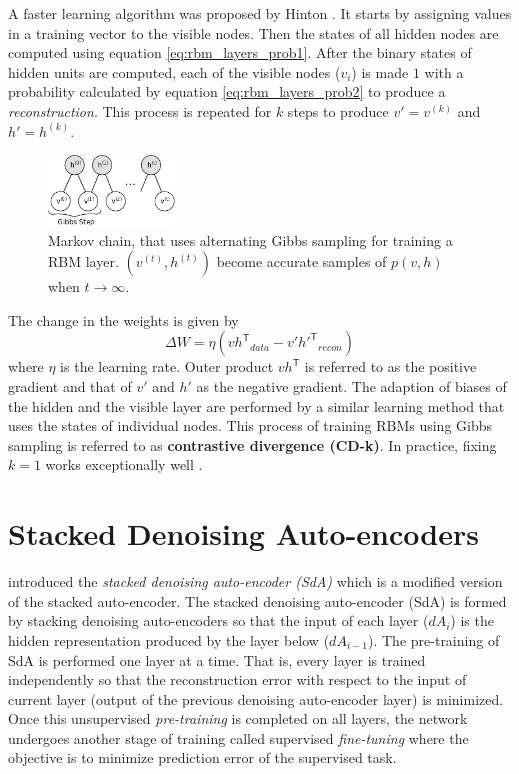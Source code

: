 A faster learning algorithm was proposed by Hinton \cite{hinton2002training,hinton2006reducing,hinton2010practical}.  It starts by assigning values in a training vector to the visible nodes.  Then the states of all hidden nodes are computed using equation \ref{eq:rbm_layers_prob1}.  After the binary states of hidden units are computed, each of the visible nodes ($v_i$) is made $1$ with a probability calculated by equation \ref{eq:rbm_layers_prob2} to produce a \textit{reconstruction}.  This process is repeated for $k$ steps to produce $v'= v^{(k)}$ and $h' = h^{(k)}$. 

\begin{figure}[ht]
\centering
\includegraphics[width=0.3\textwidth]{./imgs/markov_chain.png}
\caption[Markov chain of training RBM layer]{Markov chain, that uses alternating Gibbs sampling for training a RBM layer. $(v^{(t)}, h^{(t)})$ become accurate samples of $p(v,h)$ when $t \rightarrow \infty$.}
\label{fig:rbmmarkovChain}
\end{figure}

The change in the weights is given by
$$ \Delta W = \eta ({vh^\mathsf{T}}_{data} - {v'h'^{\mathsf{T}}}_{recon}) $$
where $\eta$ is the learning rate.  Outer product $vh^\mathsf{T}$ is referred to as the positive gradient and that of $v'$ and $h'$ as the negative gradient.  The adaption of biases of the hidden and the visible layer are performed by a similar learning method that uses the states of individual nodes.  This process of training RBMs using Gibbs sampling is referred to as \textbf{contrastive divergence (CD-k)}.  In practice, fixing $k=1$ works exceptionally well \cite{hinton2010practical}.

\section{Stacked Denoising Auto-encoders}
\citet{vincent2010stacked} introduced the \emph{stacked denoising auto-encoder (SdA)} which is a modified version of the stacked auto-encoder.  The stacked denoising auto-encoder (SdA) is formed by stacking denoising auto-encoders so that the input of each layer ($dA_i$) is the hidden representation produced by the layer below ($dA_{i-1}$).  The pre-training of SdA is performed one layer at a time.  That is, every layer is trained independently so that the reconstruction error with respect to the input of current layer (output of the previous denoising auto-encoder layer) is minimized.  Once this unsupervised \textit{pre-training} is completed on all layers, the network undergoes another stage of training called supervised \textit{fine-tuning} where the objective is to minimize prediction error of the supervised task.

